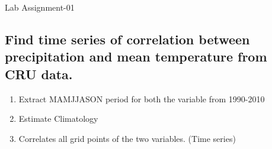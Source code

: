 \documentclass[10pt, a4paper]{article}
\begin{document}
\newpage
Lab Assignment-01
\subsection*{Find time series of correlation between precipitation and mean temperature from CRU data.}
\begin{Problem}
    \begin{enumerate}
        \item Extract MAMJJASON period for both the variable from 1990-2010
        \item Estimate Climatology
        \item Correlates all grid points of the two variables. (Time series)
    \end{enumerate}
\end{Problem}
\end{document}
